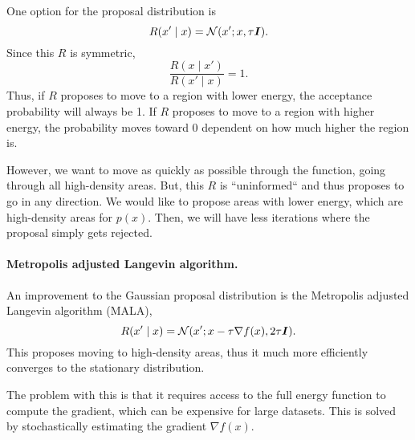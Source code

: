 One option for the proposal distribution is \[
  R(x'\mid x) = \mathcal{N}(x'; x,\tau\bm{I})
.\]
Since this $R$ is symmetric, \[
  \frac{R(x\mid x')}{R(x'\mid x)} = 1
.\]
Thus, if $R$ proposes to move to a region with lower energy, the acceptance
probability will always be 1. If $R$ proposes to move to a region with higher
energy, the probability moves toward 0 dependent on how much higher the
region is.

However, we want to move as quickly as possible through the function, going
through all high-density areas. But, this $R$ is ``uninformed`` and thus
proposes to go in any direction. We would like to propose areas with lower
energy, which are high-density areas for $p(x)$. Then, we will have less
iterations where the proposal simply gets rejected.

\paragraph{Metropolis adjusted Langevin algorithm.}

An improvement to the Gaussian proposal distribution is the Metropolis
adjusted Langevin algorithm (MALA), \[
  R(x'\mid x) = \mathcal{N}(x'; x-\tau\nabla f(x),2\tau\bm{I})
.\]
This proposes moving to high-density areas, thus it much more efficiently
converges to the stationary distribution.

The problem with this is that it requires access to the full energy function to
compute the gradient, which can be expensive for large datasets. This is solved
by stochastically estimating the gradient $\nabla f(x)$.
